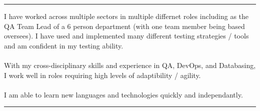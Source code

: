 \documentclass[12pt]{developercv} %
\begin{document}


\vspace{+\baselineskip}
\hrule
\vspace{+\baselineskip}

\begin{minipage}[t]{\textwidth}
{
I have worked across multiple sectors in multiple differnet roles including as the QA Team Lead of a 6 person department (with one team member being based oversees). I have used and implemented many different testing strategies / tools and am confident in my testing ability.
}
\\\\
{
With my cross-disciplinary skills and experience in QA, DevOps, and Databasing, I work well in roles requiring high levels of adaptibility / agility.
}	
\\\\
{
I am able to learn new languages and technologies quickly and independantly.
}

\end{minipage}


\vspace{\baselineskip}
\hrule
\vspace{\baselineskip}





\end{document}
